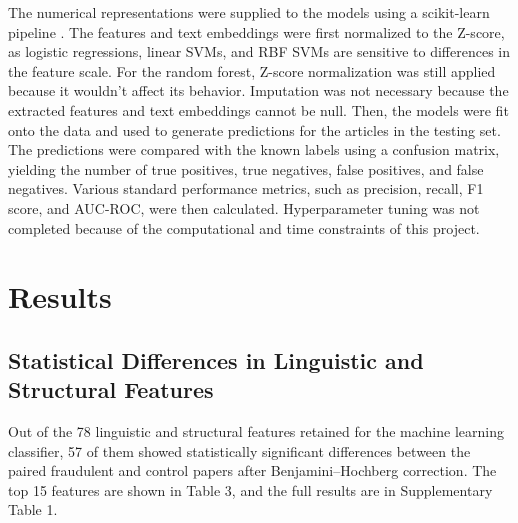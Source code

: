 \documentclass[11pt,letterpaper]{article}
\begin{document}
The numerical representations were supplied to the models using a scikit-learn pipeline \cite{pedregosa2011scikit}. The features and text embeddings were first normalized to the Z-score, as logistic regressions, linear SVMs, and RBF SVMs are sensitive to differences in the feature scale. For the random forest, Z-score normalization was still applied because it wouldn't affect its behavior. Imputation was not necessary because the extracted features and text embeddings cannot be null. Then, the models were fit onto the data and used to generate predictions for the articles in the testing set. The predictions were compared with the known labels using a confusion matrix, yielding the number of true positives, true negatives, false positives, and false negatives. Various standard performance metrics, such as precision, recall, F1 score, and AUC-ROC, were then calculated. Hyperparameter tuning was not completed because of the computational and time constraints of this project.

\section{Results}

\subsection{Statistical Differences in Linguistic and Structural Features}
Out of the 78 linguistic and structural features retained for the machine learning classifier, 57 of them showed statistically significant differences between the paired fraudulent and control papers after Benjamini--Hochberg correction. The top 15 features are shown in Table 3, and the full results are in Supplementary Table 1.
\end{document}
